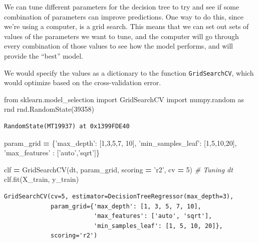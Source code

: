 \documentclass[
  letterpaper,
]{scrbook}
\newenvironment{Shaded}{\begin{snugshade}}{\end{snugshade}}
\newcommand{\CommentTok}[1]{\textcolor[rgb]{0.56,0.35,0.01}{\textit{#1}}}
\newcommand{\DecValTok}[1]{\textcolor[rgb]{0.00,0.00,0.81}{#1}}
\newcommand{\ImportTok}[1]{#1}
\newcommand{\NormalTok}[1]{#1}
\newcommand{\OperatorTok}[1]{\textcolor[rgb]{0.81,0.36,0.00}{\textbf{#1}}}
\newcommand{\StringTok}[1]{\textcolor[rgb]{0.31,0.60,0.02}{#1}}
\begin{document}
We can tune different parameters for the decision tree to try and see if
some combination of parameters can improve predictions. One way to do this,
since we're using a computer, is a grid search. This means that we can set out sets of values of the parameters we want to tune, and the computer will go through every combination of those values to see how the model
performs, and will provide the ``best'' model.

We would specify the values as a dictionary to the function \texttt{GridSearchCV}, which would optimize based on the cross-validation error.

\begin{Shaded}
\begin{Highlighting}[]
\ImportTok{from}\NormalTok{ sklearn.model_selection }\ImportTok{import}\NormalTok{ GridSearchCV}
\ImportTok{import}\NormalTok{ numpy.random }\ImportTok{as}\NormalTok{ rnd}
\NormalTok{rnd.RandomState(}\DecValTok{39358}\NormalTok{)}
\end{Highlighting}
\end{Shaded}

\begin{verbatim}
RandomState(MT19937) at 0x1399FDE40
\end{verbatim}

\begin{Shaded}
\begin{Highlighting}[]
\NormalTok{param_grid }\OperatorTok{=}\NormalTok{ \{}\StringTok{'max_depth'}\NormalTok{: [}\DecValTok{1}\NormalTok{,}\DecValTok{3}\NormalTok{,}\DecValTok{5}\NormalTok{,}\DecValTok{7}\NormalTok{, }\DecValTok{10}\NormalTok{], }\StringTok{'min_samples_leaf'}\NormalTok{: [}\DecValTok{1}\NormalTok{,}\DecValTok{5}\NormalTok{,}\DecValTok{10}\NormalTok{,}\DecValTok{20}\NormalTok{],}
  \StringTok{'max_features'}\NormalTok{ : [}\StringTok{'auto'}\NormalTok{,}\StringTok{'sqrt'}\NormalTok{]\}}

\NormalTok{clf }\OperatorTok{=}\NormalTok{ GridSearchCV(dt, param_grid, scoring }\OperatorTok{=} \StringTok{'r2'}\NormalTok{, cv }\OperatorTok{=} \DecValTok{5}\NormalTok{) }\CommentTok{# Tuning dt}
\NormalTok{clf.fit(X_train, y_train)}
\end{Highlighting}
\end{Shaded}

\begin{verbatim}
GridSearchCV(cv=5, estimator=DecisionTreeRegressor(max_depth=3),
             param_grid={'max_depth': [1, 3, 5, 7, 10],
                         'max_features': ['auto', 'sqrt'],
                         'min_samples_leaf': [1, 5, 10, 20]},
             scoring='r2')
\end{verbatim}
\end{document}
